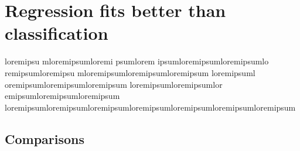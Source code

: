\chapter{Regression fits better than classification}
\label{chap:metrics}
loremipsu
mloremipsumloremi
psumlorem
ipsumloremipsumloremipsumlo
remipsumloremipsu
mloremipsumloremipsumloremipsum loremipsuml
oremipsumloremipsumloremipsum loremipsumloremipsumlor
emipsumloremipsumloremipsum  loremipsumloremipsumloremipsumloremipsumloremipsumloremipsumloremipsum

\section{Comparisons}


